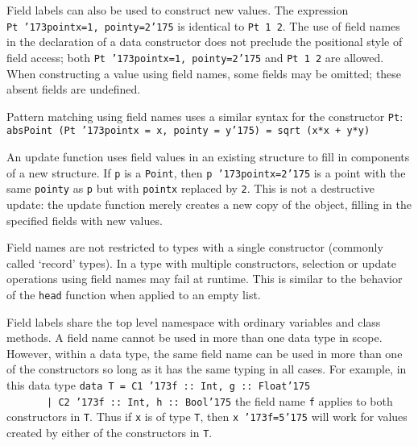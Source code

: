 Field labels can also be used to construct new values.  The expression
\mbox{\tt Pt\ {\char'173}pointx=1,\ pointy=2{\char'175}} is identical to \mbox{\tt Pt\ 1\ 2}.  The use of field
names in the declaration of a data constructor does not preclude the
positional style of field access; both
\mbox{\tt Pt\ {\char'173}pointx=1,\ pointy=2{\char'175}} and \mbox{\tt Pt\ 1\ 2} are allowed.  
When constructing a value using field names, some fields may be
omitted; these absent fields are undefined.   

Pattern matching using field names uses a similar syntax for the
constructor \mbox{\tt Pt}:
\bprog
\mbox{\tt absPoint\ (Pt\ {\char'173}pointx\ =\ x,\ pointy\ =\ y{\char'175})\ =\ sqrt\ (x*x\ +\ y*y)\ }
\eprog

An update function uses field values in an existing structure to fill
in components of a new structure.  If \mbox{\tt p} is a \mbox{\tt Point}, then 
\mbox{\tt p\ {\char'173}pointx=2{\char'175}} is a point with the same \mbox{\tt pointy} as \mbox{\tt p} but with
\mbox{\tt pointx} replaced by \mbox{\tt 2}.  This is not a destructive update:
the update function merely creates a new copy of the object, filling
in the specified fields with new values.


%
%

Field names are not restricted to types with a single constructor
(commonly called `record' types).  In a type with multiple
constructors, selection or update operations using field names may
fail at runtime.  This is similar to the behavior of the \mbox{\tt head}
function when applied to an empty list.

Field labels share the top level namespace with ordinary variables and
class methods.
A field name cannot be used in more than one data type in scope.
However, within a data type, the same field
name can be used in more than one of the constructors so long as it
has the same typing in all cases.  For example, in this data type
\bprog
\mbox{\tt data\ T\ =\ C1\ {\char'173}f\ ::\ Int,\ g\ ::\ Float{\char'175}}\\
\mbox{\tt \ \ \ \ \ \ \ |\ C2\ {\char'173}f\ ::\ Int,\ h\ ::\ Bool{\char'175}}
\eprog
the field name \mbox{\tt f} applies to both constructors in \mbox{\tt T}.  Thus if
\mbox{\tt x} is of type \mbox{\tt T}, then \mbox{\tt x\ {\char'173}f=5{\char'175}} will work for values created by
either of the constructors in \mbox{\tt T}.

